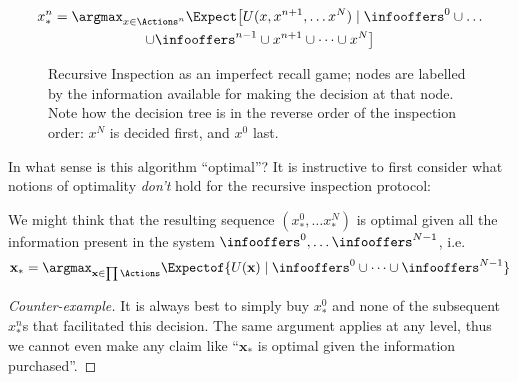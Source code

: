 \begin{multline}
  x^n_*=\argmax_{x\in\Actions^n}\Expect\bigl[
      U(x,x^{n+1},\dots x^N) \mid
      \infooffers^0\cup\dots \\
      \cup\infooffers^{n-1}\cup
      x^{n+1}\cup\dots\cup x^N
  \bigr]
  \label{infonomy:eq:imperfect-x}
\end{multline}

\begin{figure}
  \centering
  \resizebox{\columnwidth}{!}{
  
  }
  \caption{Recursive Inspection as an imperfect recall game; nodes are labelled by the information available for making the decision at that node. Note how the decision tree is in the reverse order of the inspection order: $x^N$ is decided first, and $x^0$ last.}
  \label{infonomy:fig:imperfect}
\end{figure}






In what sense is this algorithm ``optimal''? It is instructive to first consider what notions of optimality \emph{don't} hold for the recursive inspection protocol:

\begin{nontheorem}
We might think that the resulting sequence $(x^0_*,\dots x^N_*)$ is optimal given all the information present in the system $\infooffers^0,\dots\infooffers^{N-1}$, i.e.
\begin{equation*}
  \mathbf{x}_* = \argmax_{\mathbf{x}\in\prod\Actions}\Expectof{
    U(\mathbf{x})\mid \infooffers^0\cup\dots\cup\infooffers^{N-1}
  }
\end{equation*}
\end{nontheorem}
\begin{proof}[Counter-example]
It is always best to simply buy $x^0_*$ and none of the subsequent $x^n_*$s that facilitated this decision. The same argument applies at any level, thus we cannot even make any claim like ``$\mathbf{x}_*$ is optimal given the information purchased''.
\end{proof}

